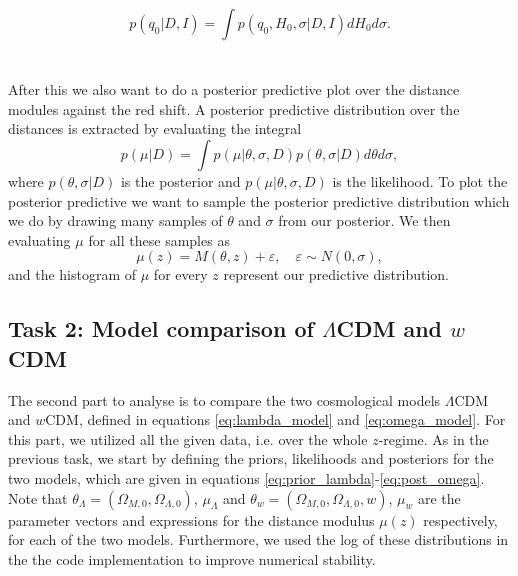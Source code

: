 \documentclass[11pt,a4paper]{article}
\begin{document}
\begin{equation*}
    p(q_0|D,I) = \int p(q_0,H_0, \sigma|D,I) d H_0 d\sigma.
\end{equation*}
\newline
\\\\
After this we also want to do a posterior predictive plot over the distance modules against the red shift. A posterior predictive distribution over the distances is extracted by evaluating the integral 
\begin{equation*}
    p(\mu| D) = \int p(\mu|\theta, \sigma, D) p(\theta, \sigma| D) d\theta d\sigma,
\end{equation*}
where $ p(\theta, \sigma| D)$ is the posterior and $p(\mu|\theta, \sigma, D)$ is the likelihood. To plot the posterior predictive we want to sample the posterior predictive distribution which we do by drawing many samples of $\theta$ and $\sigma$ from our posterior.  We then evaluating $\mu$ for all these samples as 
\begin{equation*}
    \mu(z) = M(\theta, z) + \varepsilon, \quad \varepsilon \sim N(0, \sigma),
\end{equation*}
and the histogram of $\mu$ for every $z$ represent our predictive distribution. 



\subsection[Task 2]{Task 2: Model comparison of $\Lambda$CDM and $w$CDM}

The second part to analyse is to compare the two cosmological models $\Lambda$CDM and $w$CDM, defined in equations \eqref{eq:lambda_model} and \eqref{eq:omega_model}. For this part, we utilized all the given data, i.e. over the whole $z$-regime. As in the previous task, we start by defining the priors, likelihoods and posteriors for the two models, which are given in equations \eqref{eq:prior_lambda}-\eqref{eq:post_omega}. Note that $\theta_\Lambda=(\Omega_{M,0}, \Omega_{\Lambda,0})$, $\mu_{\Lambda}$ and $\theta_w=(\Omega_{M,0}, \Omega_{\Lambda,0}, w)$, $\mu_{w}$ are the parameter vectors and expressions for the distance modulus $\mu(z)$ respectively, for each of the two models. Furthermore, we used the log of these distributions in the the code implementation to improve numerical stability. 
\end{document}
